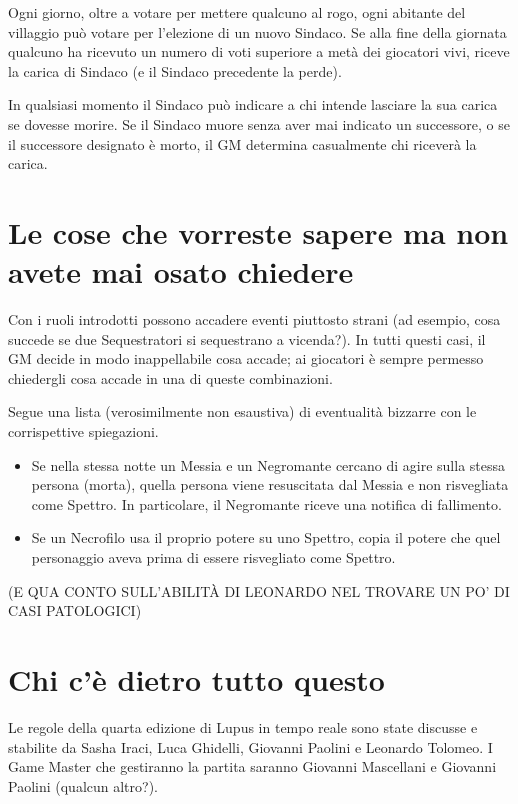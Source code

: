 \documentclass[a4paper,10pt]{article}
\begin{document}
Ogni giorno, oltre a votare per mettere qualcuno al rogo, ogni abitante del villaggio può votare per l'elezione di un nuovo Sindaco. Se alla fine della giornata qualcuno ha ricevuto un numero di voti superiore a metà dei giocatori vivi, riceve la carica di Sindaco (e il Sindaco precedente la perde).

In qualsiasi momento il Sindaco può indicare a chi intende lasciare la sua carica se dovesse morire. Se il Sindaco muore senza aver mai indicato un successore, o se il successore designato è morto, il GM determina casualmente chi riceverà la carica.


\section{Le cose che vorreste sapere ma non avete mai osato chiedere}

Con i ruoli introdotti possono accadere eventi piuttosto strani (ad esempio, cosa succede se due Sequestratori si sequestrano a vicenda?). In tutti questi casi, il GM decide in modo inappellabile cosa accade; ai giocatori è sempre permesso chiedergli cosa accade in una di queste combinazioni.

Segue una lista (verosimilmente non esaustiva) di eventualità bizzarre con le corrispettive spiegazioni.

\begin{itemize}
 \item Se nella stessa notte un Messia e un Negromante cercano di agire sulla stessa persona (morta), quella persona viene resuscitata dal Messia e non risvegliata come Spettro. In particolare, il Negromante riceve una notifica di fallimento.
 
 
 \item Se un Necrofilo usa il proprio potere su uno Spettro, copia il potere che quel personaggio aveva prima di essere risvegliato come Spettro.
\end{itemize}


(E QUA CONTO SULL'ABILITÀ DI LEONARDO NEL TROVARE UN PO' DI CASI PATOLOGICI)


\section{Chi c'è dietro tutto questo}

Le regole della quarta edizione di Lupus in tempo reale sono state discusse e stabilite da Sasha Iraci, Luca Ghidelli, Giovanni Paolini e Leonardo Tolomeo.
I Game Master che gestiranno la partita saranno Giovanni Mascellani e Giovanni Paolini (qualcun altro?).
\end{document}
